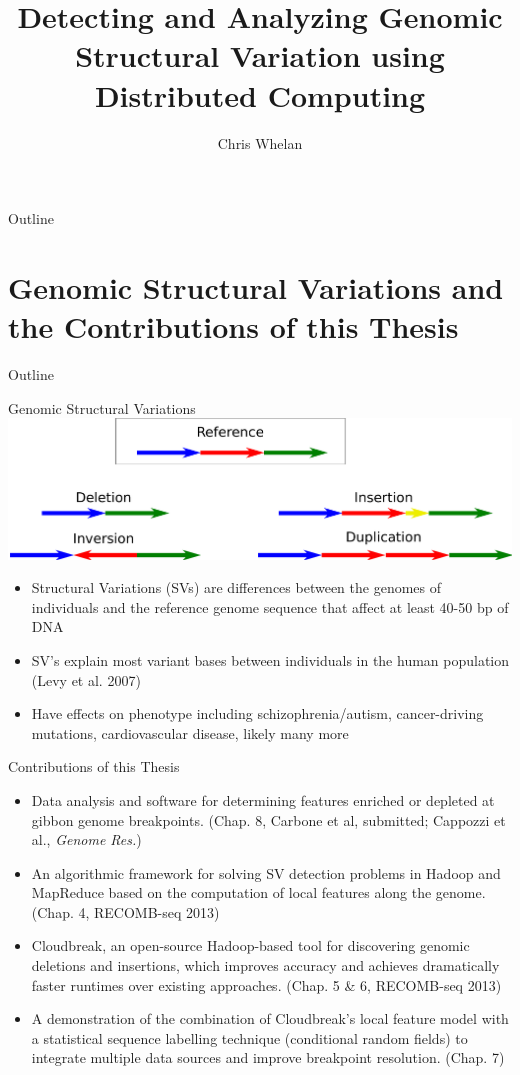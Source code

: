 \documentclass{beamer}
\title[SV Detection]{Detecting and Analyzing Genomic Structural Variation using Distributed Computing}
\author[Chris Whelan]{Chris Whelan}
\institute[OHSU]{Oregon Health \& Science University}
\begin{document}
\begin{frame}
\maketitle
\end{frame}

\begin{frame}{Outline}
  \tableofcontents
\end{frame}

\section{Genomic Structural Variations and the Contributions of this Thesis}
\begin{frame}{Outline}
  \tableofcontents[currentsection]
\end{frame}

\begin{frame}{Genomic Structural Variations}
\center
\includegraphics[width=.75\textwidth]{sv_types.pdf}
\begin{itemize}
\item Structural Variations (SVs) are differences between the genomes of individuals and the reference genome sequence that affect at least 40-50 bp of DNA
\item SV's explain most variant bases between individuals in the human
  population (Levy et al. 2007)
\item Have effects on phenotype including schizophrenia/autism, cancer-driving mutations, cardiovascular disease, likely many more
\end{itemize}
\end{frame}

\begin{frame}{Contributions of this Thesis}
\begin{itemize}
 \item Data analysis and software for determining features enriched or depleted at gibbon genome breakpoints. (Chap. 8, Carbone et al, submitted; Cappozzi et al., \emph{Genome Res.})
 \item An algorithmic framework for solving SV detection problems in Hadoop and MapReduce based on the computation of local features along the genome. (Chap. 4, RECOMB-seq 2013)
 \item Cloudbreak, an open-source Hadoop-based tool for discovering genomic deletions and insertions, which improves accuracy and achieves dramatically faster runtimes over existing approaches. (Chap. 5 \& 6, RECOMB-seq 2013)
 \item A demonstration of the combination of Cloudbreak's local feature model with a statistical sequence labelling technique (conditional random fields) to integrate multiple data sources and improve breakpoint resolution. (Chap. 7)
\end{itemize}
\end{frame}
\end{document}
